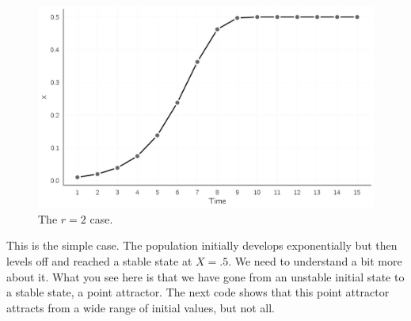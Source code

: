 \documentclass[
  a4paper,
  DIV=11,
  numbers=noendperiod,
  oneside]{scrreprt}
\begin{document}
\begin{figure}

{\centering \includegraphics{media/ch2/fig-ch2-img2.jpg}

}

\caption{\label{fig-ch2-img2}The \(r=2\) case.}

\end{figure}

This is the simple case. The population initially develops exponentially
but then levels off and reached a stable state at \(X = .5\). We need to
understand a bit more about it. What you see here is that we have gone
from an unstable initial state to a stable state, a point attractor. The
next code shows that this point attractor attracts from a wide range of
initial values, but not all.
\end{document}
